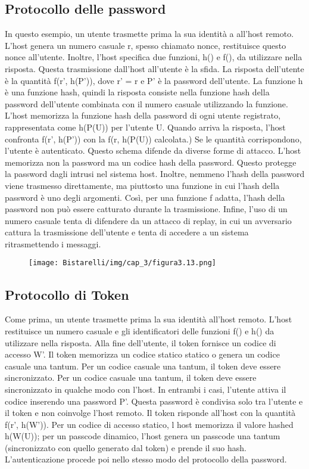 \subsection{Protocollo delle password}
In questo esempio, un utente trasmette prima la sua identità a all'host remoto. L'host genera un numero casuale r, spesso chiamato nonce, restituisce questo nonce all'utente.
\singlespacing
Inoltre, l'host specifica due funzioni, h() e f(), da utilizzare nella risposta. Questa trasmissione dall'host all'utente è la sfida. La risposta dell'utente è la quantità f(r', h(P')), dove r' = r e P' è la password dell'utente.
\singlespacing
La funzione h è una funzione hash, quindi la risposta consiste nella funzione hash della password dell'utente combinata con il numero casuale utilizzando la funzione.
\singlespacing
L'host memorizza la funzione hash della password di ogni utente registrato, rappresentata come h(P(U)) per l'utente U. Quando arriva la risposta, l'host confronta f(r', h(P')) con la f(r, h(P(U)) calcolata.) Se le quantità corrispondono, l'utente è autenticato. Questo schema difende da diverse forme di attacco. L'host memorizza non la password ma un codice hash della password. Questo protegge la password dagli intrusi nel sistema host. Inoltre, nemmeno l'hash della password viene trasmesso direttamente, ma piuttosto una funzione in cui l'hash della password è uno degli argomenti. Così, per una funzione f adatta, l'hash della password non può essere catturato durante la trasmissione.
\singlespacing
Infine, l'uso di un numero casuale tenta di difendere da un attacco di replay, in cui un avversario cattura la trasmissione dell'utente e tenta di accedere a un sistema ritrasmettendo i messaggi.
\begin{figure}[H]
	\centering
    \texttt{[image: Bistarelli/img/cap\_3/figura3.13.png]}
\end{figure}
\subsection{Protocollo di Token}
Come prima, un utente trasmette prima la sua identità all'host remoto. L'host restituisce un numero casuale e gli identificatori delle funzioni f() e h() da utilizzare nella risposta. Alla fine dell'utente, il token fornisce un codice di accesso W'. Il token memorizza un codice statico statico o genera un codice casuale una tantum. Per un codice casuale una tantum, il token deve essere sincronizzato. Per un codice casuale una tantum, il token deve essere sincronizzato in qualche modo con l'host. In entrambi i casi, l'utente attiva il codice inserendo una password P'. Questa password è condivisa solo tra l'utente e il token e non coinvolge l'host remoto. Il token risponde all'host con la quantità f(r', h(W')). Per un codice di accesso statico, l host memorizza il valore hashed h(W(U)); per un passcode dinamico, l'host genera un passcode una tantum (sincronizzato con quello generato dal token) e prende il suo hash. L'autenticazione procede poi nello stesso modo del protocollo della password.
